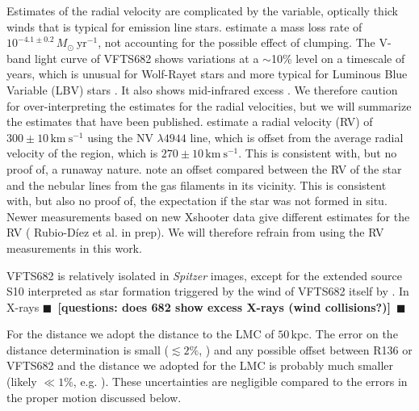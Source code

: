 \documentclass[apjl,twocolumn]{emulateapj}
\newcommand{\todo}[1]{{\large $\blacksquare$~\textbf{\color{red}[#1]}}~$\blacksquare$}
\newcommand{\kms}{{\,\mathrm{km\ s^{-1}}}}
\newcommand{\Msun}{{\,\mathrm{M}_\odot}}
\begin{document}
Estimates of the radial velocity are complicated by the variable,
optically thick winds that is typical for emission line
stars. \citet{bestenlehner:11} estimate a mass loss rate of
$10^{-4.1\pm0.2}\,M_\odot \ \mathrm{yr}^{-1}$, not accounting for the
possible effect of clumping.  The V-band light curve of VFTS682  shows
variations at a $\sim$10\% level on a timescale of years, which is
unusual for Wolf-Rayet stars and more typical for Luminous Blue
Variable (LBV) stars \citep{udalski:08, bestenlehner:11}. It also
shows mid-infrared excess \citep{gruendl:09}.  We therefore caution for over-interpreting the estimates for the radial velocities, but we will summarize the estimates that have been published.  \citet{bestenlehner:11}  estimate a radial velocity (RV) of  $300\pm10\kms$ using the  N{\footnotesize V} $\lambda4944$ line, which is offset from the average radial velocity of the region, which is  $270\pm10\kms$. This is consistent with, but no proof of, a runaway nature.  \cite{bressert:12} note an offset compared between the RV of the star and the nebular lines from the gas filaments in its vicinity. This is consistent with, but also no proof of, the expectation if the star was not formed in situ.  Newer measurements based on new Xshooter data give different estimates for the RV ({\color{blue} Rubio-D{\' i}ez et al. in prep}). We will therefore refrain from using the RV measurements in this work. 

VFTS682 is relatively isolated in \emph{Spitzer} images, except for the extended
source S10 interpreted as star formation triggered by the wind of
VFTS682 itself by \cite{walborn:13}. In X-rays
\todo{questions: does 682 show excess X-rays (wind collisions?)}


For the distance we adopt the distance to the LMC of $50$\,kpc. The error on the distance determination is small ($\lesssim2\%$, \citealt{pietrzynski:13}) and any possible offset between  R136 or VFTS682  and the distance we adopted for the LMC is probably much smaller (likely $\ll 1\%$, e.g. \citealt{Luks+1992}). These uncertainties are negligible compared to the errors in the proper motion discussed below.  

\end{document}

